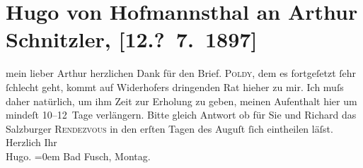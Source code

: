 

         
         \renewcommand{\erwaehntePersonen}{Personen: Leopold von Andrian-Werburg, Richard Beer-Hofmann, Hermann Widerhofer}
         \renewcommand{\erwaehnteOrte}{Orte: Bad Fusch, Salzburg, Wien}
         \renewcommand{\erwaehnteWerke}{}
               \section[Hugo von Hofmannsthal an Arthur Schnitzler, {[}12.? 7. 1897{]}]{ Hugo von Hofmannsthal an Arthur Schnitzler, {[}12.? 7. 1897{]}}\nopagebreak{}\rehead{ }\begin{ledgroupsized}[t]{13cm}\normalsize\beginnumbering \toendnotes[C]{\smallbreak\pagebreak[2]} 
\pstart{}{\pb}mein lieber
                        Arthur\pend\pstart
           herzlichen Dank für den Brief. \textsc{Poldy}, dem es fortgeſetzt ſehr ſchlecht geht, kommt auf
                        Widerhofers dringenden Rat hieher zu
                    mir. Ich muſs daher natürlich, um ihm Zeit zur Erholung zu geben, meinen
                    Aufenthalt hier um mindeſt 10–12 Tage verlängern. Bitte gleich Antwort ob \introOben{}für\introOben{}
               Sie und Richard
                    das Salzburger {\pb}\textsc{Rendezvous} in den erſten Tagen des Auguſt{ }ſich eintheilen läſst.\pend
           \pstart
           Herzlich Ihr{\\[\baselineskip]}\spacefill\mbox{Hugo.}\pend
           \leftskip=0em{}\pstart
           Bad Fusch, Montag.\pend
           
         
         \endnumbering{}\end{ledgroupsized}  \newcommand{\dateiname}{L00700}\newcommand{\titel}{Hugo von Hofmannsthal an Arthur Schnitzler, [12.? 7. 1897]}\newcommand{\editorInnen}{Martin Anton Müller und Gerd-Hermann Susen}
      